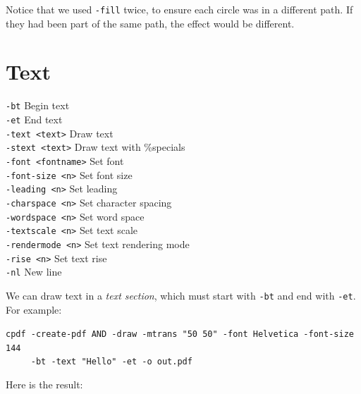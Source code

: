 \documentclass{book}
\begin{document}
\noindent Notice that we used \texttt{-fill} twice, to ensure each circle was in a different path. If they had been part of the same path, the effect would be different.


\section{Text}

  {\small\begin{framed}
   \noindent\verb!-bt! Begin text\\
   \noindent\verb!-et! End text\\
   \noindent\verb!-text <text>! Draw text\\
   \noindent\verb!-stext <text>! Draw text with \%specials\\
   \noindent\verb!-font <fontname>! Set font\\
   \noindent\verb!-font-size <n>! Set font size\\
   \noindent\verb!-leading <n>! Set leading\\
   \noindent\verb!-charspace <n>! Set character spacing\\
   \noindent\verb!-wordspace <n>! Set word space\\
   \noindent\verb!-textscale <n>! Set text scale\\
   \noindent\verb!-rendermode <n>! Set text rendering mode\\
   \noindent\verb!-rise <n>! Set text rise\\
   \noindent\verb!-nl! New line\end{framed}}

We can draw text in a \textit{text section}, which must start with \texttt{-bt} and end with \texttt{-et}. For example:

\begin{framed}
 \noindent\small\verb?cpdf -create-pdf AND -draw -mtrans "50 50" -font Helvetica -font-size 144?\\
 \noindent\small\verb?     -bt -text "Hello" -et -o out.pdf?
\end{framed}

\noindent Here is the result:

\bigskip
{}
\bigskip
\end{document}
